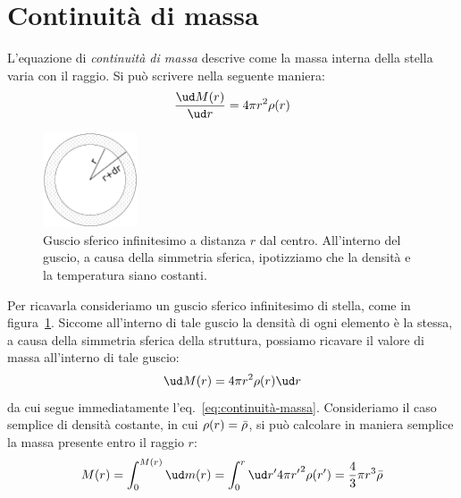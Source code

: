 \section{Continuità di massa}\label{sec:continuità-massa}
L'equazione di \emph{continuità di massa} descrive come la massa interna della stella varia con il raggio. Si può scrivere nella seguente maniera:
\begin{equation}\label{eq:continuità-massa}
    \dfrac{\ud M(r)}{\ud r} = 4 \pi r^2 \rho(r)
\end{equation}

\begin{figure}
\centering
\includegraphics[width=0.25\textwidth]{immagini/continuita-massa.png}
\caption{Guscio sferico infinitesimo a distanza $r$ dal centro. All'interno del guscio, a causa della simmetria sferica, ipotizziamo che la densità e la temperatura siano costanti.}
\label{fig:continuità-massa}
\end{figure}

Per ricavarla consideriamo un guscio sferico infinitesimo di stella, come in figura~\ref{fig:continuità-massa}. Siccome all'interno di tale guscio la densità di ogni elemento è la stessa, a causa della simmetria sferica della struttura, possiamo ricavare il valore di massa all'interno di tale guscio:
\[
    \ud M(r) = 4 \pi r^2 \rho(r) \ud r
\]
da cui segue immediatamente l'eq.~\eqref{eq:continuità-massa}. Consideriamo il caso semplice di densità costante, in cui $\rho(r) = \Bar{\rho}$, si può calcolare in  maniera semplice la massa presente entro il raggio $r$:
\[
    M(r) = \int_0^{M(r)} \ud m(r) = \int_0^r \ud r' 4 \pi {r'}^2 \rho(r') = \frac{4}{3} \pi r^3 \Bar{\rho}
\]
